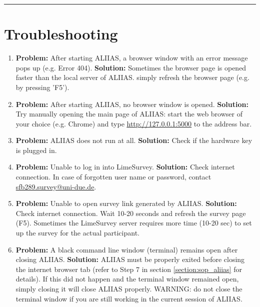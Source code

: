 \par\noindent\rule{\textwidth\color{pniblue}}{0.4pt}
\section{Troubleshooting}
\label{section:faq}

\begin{enumerate}

    \item \label{faq:err404} \textbf{Problem:}
    After starting ALIIAS, a browser window with an error message pops up (e.g. Error 404).
    \newline
    \textbf{Solution:}
    Sometimes the browser page is opened faster than the local server of ALIIAS. simply refresh the browser page (e.g. by pressing 'F5'). 
    
    \item \label{faq:nobrowser} \textbf{Problem:}
    After starting ALIIAS, no browser window is opened.
    \newline
    \textbf{Solution:}
    Try manually opening the main page of ALIIAS: start the web browser of your choice (e.g. Chrome) and type
    \href{http://127.0.0.1:5000}{\color{pniblue}\underline{http://127.0.0.1:5000}} to the address bar.
    
    \item \label{faq:nostart} \textbf{Problem:}
    ALIIAS does not run at all.
    \newline
    \textbf{Solution:}
    Check if the hardware key is plugged in.
    
    \item \label{faq:ls_login} \textbf{Problem:}
    Unable to log in into LimeSurvey.
    \newline
    \textbf{Solution:}
    Check internet connection. In case of forgotten user name or password, contact \href{mailto:sfb289.survey@uni-due.de}{sfb289.survey@uni-due.de}.
    
    \item \label{faq:survey_link} \textbf{Problem:}
    Unable to open survey link generated by ALIIAS.
    \newline
    \textbf{Solution:}
    Check internet connection. Wait 10-20 seconds and refresh the survey page (F5). Sometimes the LimeSurvey server requires more time (10-20 sec) to set up the survey for the actual participant.
    
    
     \item \label{faq:exit} \textbf{Problem:}
    A black command line window (terminal) remains open after closing ALIIAS.
    \newline
    \textbf{Solution:}
    ALIIAS must be properly exited before closing the internet browser tab (refer to Step 7 in section \ref{section:sop_aliias} for details). If this did not happen and the terminal window remained open, simply closing it will close ALIIAS properly. WARNING: do not close the terminal window if you are still working in the current session of ALIIAS.
    

\end{enumerate}
